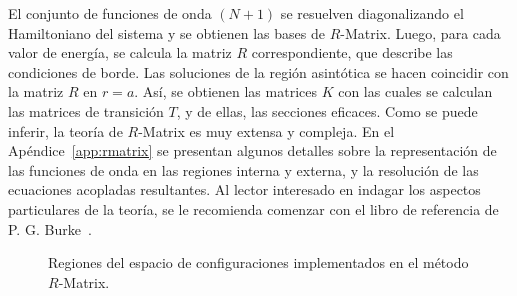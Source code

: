El conjunto de funciones de onda $(N+1)$ se resuelven diagonalizando el
Hamiltoniano del sistema y se obtienen las bases de $R$-Matrix.
Luego, para cada valor de energía, se calcula la matriz $R$ 
correspondiente, que describe las condiciones de borde. Las soluciones 
de la región asintótica se hacen coincidir con la matriz $R$ en $r=a$. 
Así, se obtienen las matrices $K$ con las cuales se calculan las 
matrices de transición $T$, y de ellas, las secciones eficaces. 
Como se puede inferir, la teoría de $R$-Matrix es muy extensa y compleja.
En el Apéndice~\ref{app:rmatrix} se presentan algunos detalles sobre la 
representación de las funciones de onda en las regiones interna y 
externa, y la resolución de las ecuaciones acopladas resultantes. 
Al lector interesado en indagar los aspectos particulares de la teoría,
se le recomienda comenzar con el libro de referencia de 
P. G. Burke~\cite{Burke:11}.

\begin{figure}
\centering
{}
\vspace{0.5cm}
\caption{Regiones del espacio de configuraciones implementados en el 
método $R$-Matrix.}
\label{fig:rmatrix-regions}
\end{figure}

